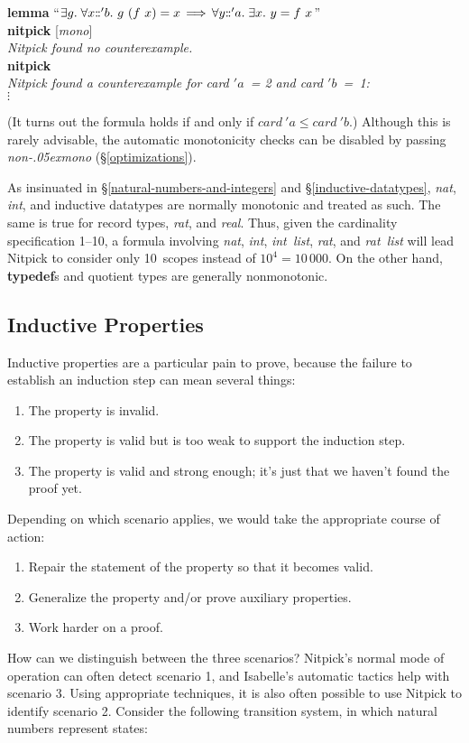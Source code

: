 \documentclass[a4paper,12pt]{article}
\def\Colon{\mathord{:\mkern-1.5mu:}}
\renewcommand\_{\hbox{\textunderscore\kern-.05ex}}
\begin{document}
\prew
\textbf{lemma} ``$\exists g.\; \forall x\Colon 'b.~g~(f~x) = x
 \,\Longrightarrow\, \forall y\Colon {'}a.\; \exists x.~y = f~x$'' \\
\textbf{nitpick} [\textit{mono}] \\[2\smallskipamount]
{\slshape Nitpick found no counterexample.} \\[2\smallskipamount]
\textbf{nitpick} \\[2\smallskipamount]
\slshape
Nitpick found a counterexample for \textit{card} $'a$~= 2 and \textit{card} $'b$~=~1: \\
\hbox{}\qquad $\vdots$
\postw

(It turns out the formula holds if and only if $\textit{card}~'a \le
\textit{card}~'b$.) Although this is rarely advisable, the automatic
monotonicity checks can be disabled by passing \textit{non\_mono}
(\S\ref{optimizations}).

As insinuated in \S\ref{natural-numbers-and-integers} and
\S\ref{inductive-datatypes}, \textit{nat}, \textit{int}, and inductive datatypes
are normally monotonic and treated as such. The same is true for record types,
\textit{rat}, and \textit{real}. Thus, given the
cardinality specification 1--10, a formula involving \textit{nat}, \textit{int},
\textit{int~list}, \textit{rat}, and \textit{rat~list} will lead Nitpick to
consider only 10~scopes instead of $10^4 = 10\,000$. On the other hand,
\textbf{typedef}s and quotient types are generally nonmonotonic.

\subsection{Inductive Properties}
\label{inductive-properties}

Inductive properties are a particular pain to prove, because the failure to
establish an induction step can mean several things:
%
\begin{enumerate}
\item The property is invalid.
\item The property is valid but is too weak to support the induction step.
\item The property is valid and strong enough; it's just that we haven't found
the proof yet.
\end{enumerate}
%
Depending on which scenario applies, we would take the appropriate course of
action:
%
\begin{enumerate}
\item Repair the statement of the property so that it becomes valid.
\item Generalize the property and/or prove auxiliary properties.
\item Work harder on a proof.
\end{enumerate}
%
How can we distinguish between the three scenarios? Nitpick's normal mode of
operation can often detect scenario 1, and Isabelle's automatic tactics help with
scenario 3. Using appropriate techniques, it is also often possible to use
Nitpick to identify scenario 2. Consider the following transition system,
in which natural numbers represent states:
\end{document}
